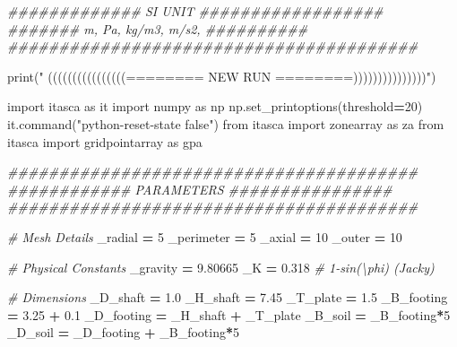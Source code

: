 \documentclass[a4paper, nobind]{templates/ociamthesis}
\newenvironment{Shaded}{\begin{snugshade}}{\end{snugshade}}
\newcommand{\BuiltInTok}[1]{#1}
\newcommand{\CommentTok}[1]{\textcolor[rgb]{0.56,0.35,0.01}{\textit{#1}}}
\newcommand{\DecValTok}[1]{\textcolor[rgb]{0.00,0.00,0.81}{#1}}
\newcommand{\FloatTok}[1]{\textcolor[rgb]{0.00,0.00,0.81}{#1}}
\newcommand{\ImportTok}[1]{#1}
\newcommand{\NormalTok}[1]{#1}
\newcommand{\OperatorTok}[1]{\textcolor[rgb]{0.81,0.36,0.00}{\textbf{#1}}}
\newcommand{\StringTok}[1]{\textcolor[rgb]{0.31,0.60,0.02}{#1}}
\renewenvironment{Shaded}
{
  \vspace{10pt}%
  \begin{snugshade}%
}{%
  \end{snugshade}%
  \vspace{8pt}%
}
\begin{document}
\begin{Shaded}
\begin{Highlighting}[]
\CommentTok{\#\#\#\#\#\#\#\#\#\#\#\#\# SI UNIT \#\#\#\#\#\#\#\#\#\#\#\#\#\#\#\#\#\#}
\CommentTok{\#\#\#\#\#\#\# m, Pa, kg/m3, m/s2,   \#\#\#\#\#\#\#\#\#\#}
\CommentTok{\#\#\#\#\#\#\#\#\#\#\#\#\#\#\#\#\#\#\#\#\#\#\#\#\#\#\#\#\#\#\#\#\#\#\#\#\#\#\#\#}

\BuiltInTok{print}\NormalTok{(}\StringTok{"       ((((((((((((((((======== NEW RUN ========)))))))))))))))"}\NormalTok{)}

\ImportTok{import}\NormalTok{ itasca }\ImportTok{as}\NormalTok{ it}
\ImportTok{import}\NormalTok{ numpy }\ImportTok{as}\NormalTok{ np}
\NormalTok{np.set\_printoptions(threshold}\OperatorTok{=}\DecValTok{20}\NormalTok{)}
\NormalTok{it.command(}\StringTok{"python{-}reset{-}state false"}\NormalTok{)}
\ImportTok{from}\NormalTok{ itasca }\ImportTok{import}\NormalTok{ zonearray }\ImportTok{as}\NormalTok{ za}
\ImportTok{from}\NormalTok{ itasca }\ImportTok{import}\NormalTok{ gridpointarray }\ImportTok{as}\NormalTok{ gpa}

\CommentTok{\#\#\#\#\#\#\#\#\#\#\#\#\#\#\#\#\#\#\#\#\#\#\#\#\#\#\#\#\#\#\#\#\#\#\#\#\#\#\#\#}
\CommentTok{\#\#\#\#\#\#\#\#\#\#\#\# PARAMETERS \#\#\#\#\#\#\#\#\#\#\#\#\#\#\#\#}
\CommentTok{\#\#\#\#\#\#\#\#\#\#\#\#\#\#\#\#\#\#\#\#\#\#\#\#\#\#\#\#\#\#\#\#\#\#\#\#\#\#\#\#}

\CommentTok{\# Mesh Details}
\NormalTok{\_radial }\OperatorTok{=} \DecValTok{5}
\NormalTok{\_perimeter }\OperatorTok{=} \DecValTok{5}
\NormalTok{\_axial }\OperatorTok{=} \DecValTok{10}
\NormalTok{\_outer }\OperatorTok{=} \DecValTok{10}

\CommentTok{\# Physical Constants}
\NormalTok{\_gravity }\OperatorTok{=} \FloatTok{9.80665}
\NormalTok{\_K }\OperatorTok{=} \FloatTok{0.318} \CommentTok{\# 1{-}sin(\textbackslash{}phi) (Jacky)}

\CommentTok{\# Dimensions}
\NormalTok{\_D\_shaft }\OperatorTok{=} \FloatTok{1.0}
\NormalTok{\_H\_shaft }\OperatorTok{=} \FloatTok{7.45}
\NormalTok{\_T\_plate }\OperatorTok{=} \FloatTok{1.5}
\NormalTok{\_B\_footing }\OperatorTok{=} \FloatTok{3.25} \OperatorTok{+} \FloatTok{0.1}
\NormalTok{\_D\_footing }\OperatorTok{=}\NormalTok{ \_H\_shaft }\OperatorTok{+}\NormalTok{ \_T\_plate}
\NormalTok{\_B\_soil }\OperatorTok{=}\NormalTok{ \_B\_footing}\OperatorTok{*}\DecValTok{5}
\NormalTok{\_D\_soil }\OperatorTok{=}\NormalTok{ \_D\_footing }\OperatorTok{+}\NormalTok{ \_B\_footing}\OperatorTok{*}\DecValTok{5}


\end{Highlighting}
\end{Shaded}
\end{document}
